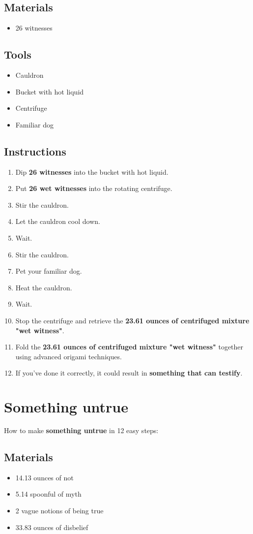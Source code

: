\documentclass{article}
\begin{document}
\subsection{Materials}\begin{itemize}
\item 
26 witnesses
\end{itemize}
\subsection{Tools}\begin{itemize}
\item 
Cauldron
\item 
Bucket with hot liquid
\item 
Centrifuge
\item 
Familiar dog
\end{itemize}
\subsection{Instructions}\begin{enumerate}
\item 
Dip \textbf{26 witnesses} into the bucket with hot liquid.
\item 
Put \textbf{26 wet witnesses} into the rotating centrifuge.
\item 
Stir the cauldron.
\item 
Let the cauldron cool down.
\item 
Wait.
\item 
Stir the cauldron.
\item 
Pet your familiar dog.
\item 
Heat the cauldron.
\item 
Wait.
\item 
Stop the centrifuge and retrieve the \textbf{23.61 ounces of centrifuged mixture "wet witness"}.
\item 
Fold the \textbf{23.61 ounces of centrifuged mixture "wet witness"} together using advanced origami techniques.
\item 
If you've done it correctly, it could result in \textbf{something that can testify}.
\end{enumerate}
\newpage
\section{Something untrue}How to make \textbf{something untrue} in 12 easy steps:

\subsection{Materials}\begin{itemize}
\item 
14.13 ounces of not
\item 
5.14 spoonful of myth
\item 
2 vague notions of being true
\item 
33.83 ounces of disbelief
\end{itemize}
\end{document}
